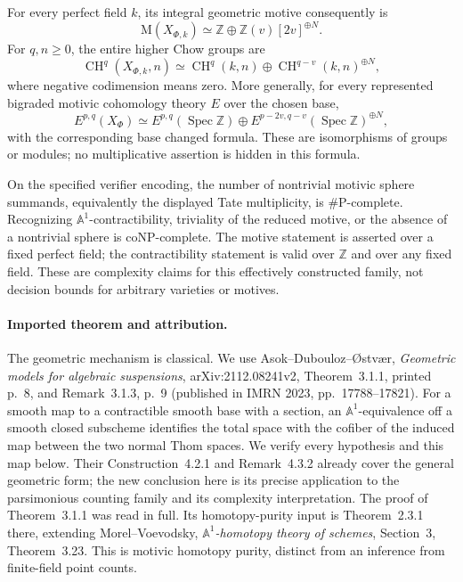 For every perfect field $k$, its integral geometric motive consequently is
\begin{equation}\label{eq:S017-motive}
 \mathrm M(X_{\Phi,k})\simeq
       \mathbb Z\oplus\mathbb Z(v)[2v]^{\oplus N}.
\end{equation}
For $q,n\ge0$, the entire higher Chow groups are
\begin{equation}\label{eq:S017-higher-chow}
 \operatorname{CH}^{q}(X_{\Phi,k},n)\simeq
 \operatorname{CH}^{q}(k,n)\oplus
       \operatorname{CH}^{q-v}(k,n)^{\oplus N},
\end{equation}
where negative codimension means zero. More generally, for every represented
bigraded motivic cohomology theory $E$ over the chosen base,
\[
 E^{p,q}(X_\Phi)\simeq E^{p,q}(\operatorname{Spec}\mathbb Z)
       \oplus E^{p-2v,q-v}(\operatorname{Spec}\mathbb Z)^{\oplus N},
\]
with the corresponding base changed formula. These are isomorphisms of
groups or modules; no multiplicative assertion is hidden in this formula.

On the specified verifier encoding, the number of nontrivial motivic
sphere summands, equivalently the displayed Tate multiplicity, is
\#P-complete. Recognizing $\mathbb A^1$-contractibility, triviality of the
reduced motive, or the absence of a nontrivial sphere is coNP-complete.
The motive statement is asserted over a fixed perfect field; the
contractibility statement is valid over $\mathbb Z$ and over any fixed
field. These are complexity claims for this effectively constructed
family, not decision bounds for arbitrary varieties or motives.

\paragraph{Imported theorem and attribution.}
The geometric mechanism is classical. We use Asok--Dubouloz--\O stv\ae r,
\emph{Geometric models for algebraic suspensions}, arXiv:2112.08241v2,
Theorem~3.1.1, printed p.~8, and Remark~3.1.3, p.~9
(published in IMRN 2023, pp.~17788--17821).
For a smooth map to a contractible smooth base with a section, an
$\mathbb A^1$-equivalence off a smooth closed subscheme identifies the
total space with the cofiber of the induced map between the two normal
Thom spaces. We verify every hypothesis and this map below. Their
Construction~4.2.1 and Remark~4.3.2 already cover the general geometric
form; the new conclusion here is its precise application to the
parsimonious counting family and its complexity interpretation.
The proof of Theorem~3.1.1 was read in full. Its homotopy-purity input
is Theorem~2.3.1 there, extending Morel--Voevodsky,
\emph{$\mathbb A^1$-homotopy theory of schemes}, Section~3,
Theorem~3.23. This is motivic homotopy purity, distinct from an
inference from finite-field point counts.

